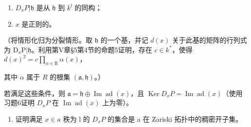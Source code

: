 \begin{enumerate}
\def\labelenumi{(\roman{enumi})}
\item
  \(D_{x}P|\mathfrak{h}\) 是从 \(\mathfrak{h}\) 到 \(k^{l}\) 的同构；
\item
  \(x\) 是正则的。
\end{enumerate}

（将情形化归为分裂情形。取 \(\mathfrak{h}\) 的一个基，并记 \(d(x)\) 关于此基的矩阵的行列式为 \(\mathrm{D}_x\mathrm{P}|\mathfrak{h}\)。利用第V章§5第4节的命题5证明，存在 \(c \in k^*\)，使得 \(d(x)^2 = c \prod_{\alpha \in \mathrm{R}} \alpha(x)\)，

其中 \(\alpha\) 属于 \(R\) 的根集 \((\mathfrak{a},\mathfrak{h})\)。）

若满足这些条件，则 \(\mathfrak{a} = \mathfrak{h} \oplus \operatorname{Im} \operatorname{ad}(x)\)，且 \(\operatorname{Ker} D_x P = \operatorname{Im} \operatorname{ad}(x)\)（使用习题6证明 \(D_x P\) 在 \(\operatorname{Im} \operatorname{ad}(x)\) 上为零）。

\begin{enumerate}
\def\labelenumi{\alph{enumi})}
\setcounter{enumi}{1}
\tightlist
\item
  证明满足 \(x \in a\) 秩为 l 的 \(D_{x}P\) 的集合是 a 在 Zariski 拓扑中的稠密开子集。
\end{enumerate}

